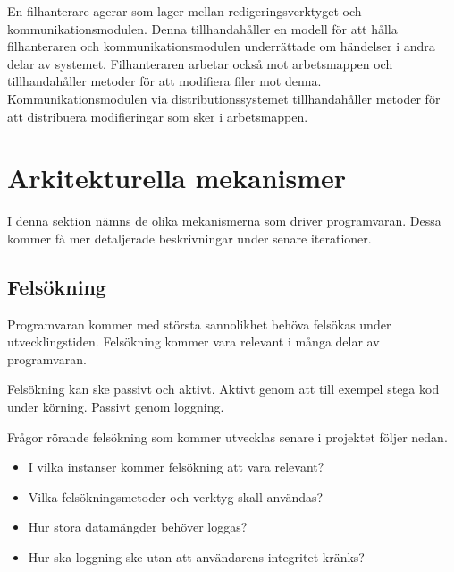 En filhanterare agerar som lager mellan redigeringsverktyget och
kommunikationsmodulen. Denna tillhandahåller en modell för att hålla
filhanteraren och kommunikationsmodulen underrättade om händelser i
andra delar av systemet. Filhanteraren arbetar också mot arbetsmappen
och tillhandahåller metoder för att modifiera filer mot
denna. Kommunikationsmodulen via distributionssystemet tillhandahåller
metoder för att distribuera modifieringar som sker i arbetsmappen.
\section{Arkitekturella mekanismer}
I denna sektion nämns de olika mekanismerna som driver
programvaran. Dessa kommer få mer detaljerade beskrivningar under
senare iterationer.
\subsection{Felsökning}
Programvaran kommer med största sannolikhet behöva felsökas under
utvecklingstiden. Felsökning kommer vara relevant i många delar av
programvaran.

Felsökning kan ske passivt och aktivt. Aktivt genom att till exempel
stega kod under körning. Passivt genom loggning.

Frågor rörande felsökning som kommer utvecklas senare i projektet följer nedan.
\begin{itemize}
\item I vilka instanser kommer felsökning att vara relevant?
\item Vilka felsökningsmetoder och verktyg skall användas?
\item Hur stora datamängder behöver loggas?
\item Hur ska loggning ske utan att användarens integritet kränks?
\end{itemize}
